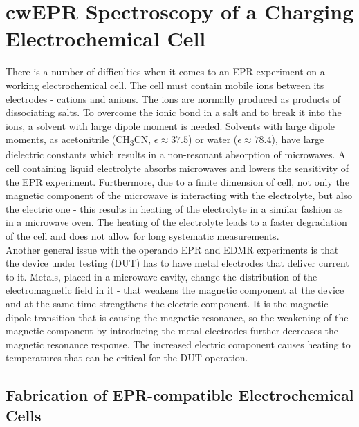 \section{cwEPR Spectroscopy of a Charging Electrochemical Cell}
There is a number of difficulties when it comes to an EPR experiment on a working electrochemical cell. The cell must contain mobile ions between its electrodes - cations and anions. The ions are normally produced as products of dissociating salts. To overcome the ionic bond in a salt and to break it into the ions, a solvent with large dipole moment is needed. Solvents with large dipole moments, as acetonitrile (CH\textsubscript{3}CN, $\epsilon\approx 37.5$) or water ($\epsilon\approx78.4$), have large dielectric constants which results in a non-resonant absorption of microwaves. A cell containing liquid electrolyte absorbs microwaves and lowers the sensitivity of the EPR experiment. Furthermore, due to a finite dimension of cell, not only the magnetic component of the microwave is interacting with the electrolyte, but also the electric one - this results in heating of the electrolyte in a similar fashion as in a microwave oven. The heating of the electrolyte leads to a faster degradation of the cell and does not allow for long systematic measurements.\\
Another general issue with the operando EPR and EDMR experiments is that the device under testing (DUT) has to have metal electrodes that deliver current to it. Metals, placed in a microwave cavity, change the distribution of the electromagnetic field in it - that weakens the magnetic component at the device and at the same time strengthens the electric component. It is the magnetic dipole transition that is causing the magnetic resonance, so the weakening of the magnetic component by introducing the metal electrodes further decreases the magnetic resonance response. The increased electric component causes heating to temperatures that can be critical for the DUT operation.

\subsection{Fabrication of EPR-compatible Electrochemical Cells}

